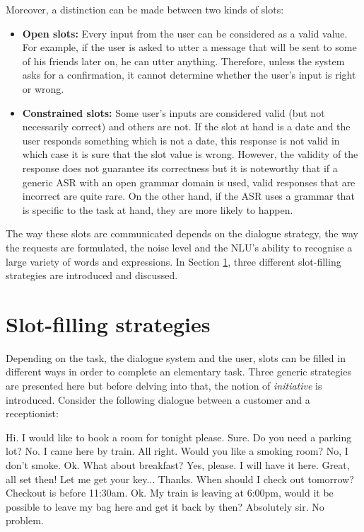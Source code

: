 	Moreover, a distinction can be made between two kinds of slots:
	
	\begin{itemize}
		\item \textbf{Open slots:} Every input from the user can be considered as a valid value. For example, if the user is asked to utter a message that will be sent to some of his friends later on, he can utter anything. Therefore, unless the system asks for a confirmation, it cannot determine whether the user's input is right or wrong.
		\item \textbf{Constrained slots:} Some user's inputs are considered valid (but not necessarily correct) and others are not. If the slot at hand is a date and the user responds something which is not a date, this response is not valid in which case it is sure that the slot value is wrong. However, the validity of the response does not guarantee its correctness but it is noteworthy that if a generic ASR with an open grammar domain is used, valid responses that are incorrect are quite rare. On the other hand, if the ASR uses a grammar that is specific to the task at hand, they are more likely to happen.
	\end{itemize}
	
	The way these slots are communicated depends on the dialogue strategy, the way the requests are formulated, the noise level and the NLU's ability to recognise a large variety of words and expressions. In Section \ref{sec:slotfillstrat}, three different slot-filling strategies are introduced and discussed.

\section{Slot-filling strategies}
\label{sec:slotfillstrat}

	Depending on the task, the dialogue system and the user, slots can be filled in different ways in order to complete an elementary task. Three generic strategies are presented here but before delving into that, the notion of \textit{initiative} is introduced. Consider the following dialogue between a customer and a receptionist:
	
	\begin{dialogue}
		 Hi. I would like to book a room for tonight please.
		 Sure. Do you need a parking lot?
		 No. I came here by train.
		 All right. Would you like a smoking room?
		 No, I don't smoke.
		 Ok. What about breakfast?
		 Yes, please. I will have it here.
		 Great, all set then! Let me get your key...
		 Thanks. When should I check out tomorrow?
		 Checkout is before 11:30am.
		 Ok. My train is leaving at 6:00pm, would it be possible to leave my bag here and get it back by then?
		 Absolutely sir. No problem.
	\end{dialogue}

